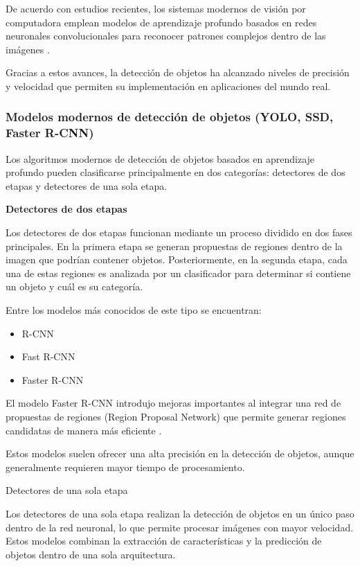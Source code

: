 De acuerdo con estudios recientes, los sistemas modernos de visión por computadora emplean modelos de aprendizaje profundo basados en redes neuronales convolucionales para reconocer patrones complejos dentro de las imágenes \cite{fvivas_guia_cv}.

Gracias a estos avances, la detección de objetos ha alcanzado niveles de precisión y velocidad que permiten su implementación en aplicaciones del mundo real.


\subsubsection{Modelos modernos de detección de objetos (YOLO, SSD, Faster R-CNN)}
Los algoritmos modernos de detección de objetos basados en aprendizaje profundo pueden clasificarse principalmente en dos categorías: detectores de dos etapas y detectores de una sola etapa.

\textbf{Detectores de dos etapas}

Los detectores de dos etapas funcionan mediante un proceso dividido en dos fases principales. En la primera etapa se generan propuestas de regiones dentro de la imagen que podrían contener objetos. Posteriormente, en la segunda etapa, cada una de estas regiones es analizada por un clasificador para determinar si contiene un objeto y cuál es su categoría.

Entre los modelos más conocidos de este tipo se encuentran:
\begin{itemize}
    \item R-CNN
    \item Fast R-CNN
    \item Faster R-CNN
\end{itemize}

El modelo Faster R-CNN introdujo mejoras importantes al integrar una red de propuestas de regiones (Region Proposal Network) que permite generar regiones candidatas de manera más eficiente \cite{geeksforgeeks_object_detection}.

Estos modelos suelen ofrecer una alta precisión en la detección de objetos, aunque generalmente requieren mayor tiempo de procesamiento.

Detectores de una sola etapa

Los detectores de una sola etapa realizan la detección de objetos en un único paso dentro de la red neuronal, lo que permite procesar imágenes con mayor velocidad. Estos modelos combinan la extracción de características y la predicción de objetos dentro de una sola arquitectura.

